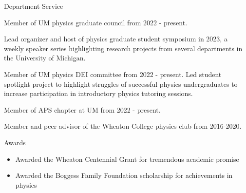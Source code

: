 \documentclass{resume} %
\begin{document}

\begin{rSection}{Department Service}
    \begin{itemize}
        \item{Member of UM physics graduate council from 2022 - present. 
        \item Lead organizer and host of physics graduate student symposium in 2023, a weekly speaker series highlighting research projects from several departments in the University of Michigan.}
    \item{Member of UM physics DEI committee from 2022 - present. Led student spotlight project to highlight struggles of successful physics undergraduates to increase participation in introductory physics tutoring sessions.}
    \item Member of APS chapter at UM from 2022 - present.
    \item Member and peer advisor of the Wheaton College physics club from 2016-2020.
    \end{itemize}
    \end{rSection}
    
    \begin{rSection}{Awards}
        \begin{itemize}
            \item Awarded the Wheaton Centennial Grant for tremendous academic promise
            \item Awarded the Boggess Family Foundation scholarship for achievements in physics
        \end{itemize}
                
        \end{rSection}

\end{document}
